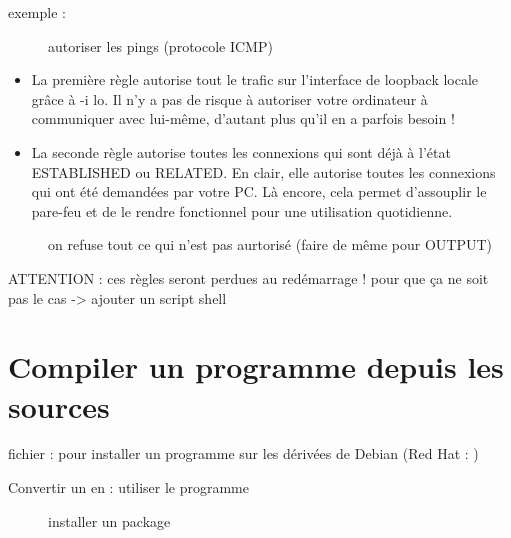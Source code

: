 \documentclass[letterpaper,10pt,french]{sphinxmanual}
\begin{document}
exemple : 
\begin{description}
\item[{}] \leavevmode
autoriser les pings (protocole ICMP)

\end{description}


\begin{itemize}
\item {} 
La première règle autorise tout le trafic sur l’interface de loopback locale grâce à -i lo. Il n’y a pas de risque à autoriser votre ordinateur à communiquer avec lui-même, d’autant plus qu’il en a parfois besoin !

\item {} 
La seconde règle autorise toutes les connexions qui sont déjà à l’état ESTABLISHED ou RELATED. En clair, elle autorise toutes les connexions qui ont été demandées par votre PC. Là encore, cela permet d’assouplir le pare-feu et de le rendre fonctionnel pour une utilisation quotidienne.

\end{itemize}
\begin{description}
\item[{}] \leavevmode
on refuse tout ce qui n’est pas aurtorisé (faire de même pour OUTPUT)

\end{description}

ATTENTION : ces règles seront perdues au redémarrage ! pour que ça ne soit pas le cas -\textgreater{} ajouter un script shell


\chapter{Compiler un programme depuis les sources}
\label{\detokenize{19-compiler:compiler-un-programme-depuis-les-sources}}\label{\detokenize{19-compiler::doc}}
fichier  : pour installer un programme sur les dérivées de Debian (Red Hat : )

Convertir un  en  : utiliser le programme 
\begin{description}
\item[{}] \leavevmode
installer un package 

\end{description}
\end{document}

